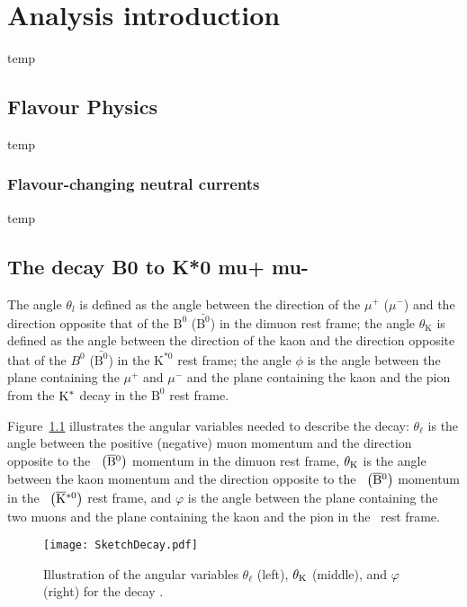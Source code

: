 \chapter{Analysis introduction}
\label{sec:theo}

temp

\section{Flavour Physics}
\label{sec:flav}

temp

\subsection{Flavour-changing neutral currents}
\label{sec:FCNC}

temp

\section{The decay B0 to K*0 mu+ mu-}
\label{sec:Kstmm}




The angle $\theta_l$ is defined as the angle between the direction of the $\mu^+ $ ($\mu^- $) and the direction opposite that of the $\text{B}^0$ ($\bar{\text{B}^0}$) in the dimuon rest frame; the angle $\theta_\mathrm{K} $ is defined as the angle between the direction of the kaon and the direction opposite that of the $B^0$ ($\bar{\text{B}^0}$) in the $\text{K}^{*0}$ rest frame; the angle $\phi$ is the angle between the plane containing the $\mu^+ $ and $\mu^- $ and the plane containing the kaon and the pion from the $\textrm{K}^\ast$ decay in the $\text{B}^0$ rest frame.

Figure~\ref{fig:ske} illustrates the angular variables needed to describe the decay: $\theta_\ell$ is the angle between the positive (negative) muon momentum and the direction opposite to the \PBz\ $\big(\overline{\textrm{B}}{}^{0}\big)$ momentum in the dimuon rest frame, $\theta_\textrm{K}$ is the angle between the kaon momentum and the direction opposite to the \PBz\ $\big(\overline{\textrm{B}}{}^{0}\big)$ momentum in the \cPKstz\ $\big(\overline{\textrm{K}}{}^{\ast0}\big)$ rest frame, and $\varphi$ is the angle between the plane containing the two muons and the plane containing the kaon and the pion in the \PBz\ rest frame.

\begin{figure*}[t]
  \begin{center}
    \texttt{[image: SketchDecay.pdf]}
    \caption{Illustration of the angular variables $\theta_\ell$ (left), $\theta_\textrm{K}$ (middle), and $\varphi$ (right) for the decay \BtoKstmumudecay.}
    \label{fig:ske}
  \end{center}
\end{figure*}

